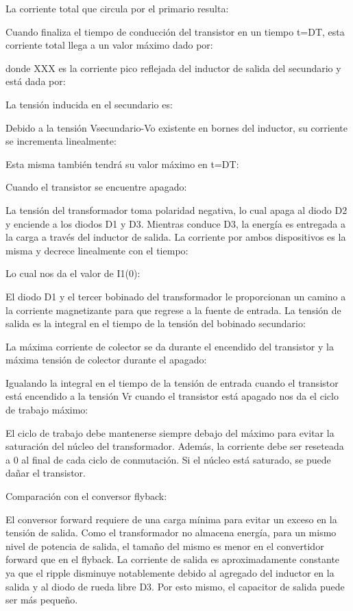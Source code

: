La corriente total que circula por el primario resulta:

Cuando finaliza el tiempo de conducción del transistor en un tiempo t=DT, esta corriente total llega a un valor máximo dado por:

donde XXX es la corriente pico reflejada del inductor de salida del secundario y está dada por:

La tensión inducida en el secundario es:

Debido a la tensión Vsecundario-Vo existente en bornes del inductor, su corriente se incrementa linealmente:

Esta misma también tendrá su valor máximo en t=DT:


Cuando el transistor se encuentre apagado:

La tensión del transformador toma polaridad negativa, lo cual apaga al diodo D2 y enciende a los diodos D1 y D3. 
Mientras conduce D3, la energía es entregada a la carga a través del inductor de salida. 
La corriente por ambos dispositivos es la misma y decrece linealmente con el tiempo:

Lo cual nos da el valor de I1(0):


El diodo D1 y el tercer bobinado del transformador le proporcionan un camino 
a la corriente magnetizante para que regrese a la fuente de entrada. 
La tensión de salida es la integral en el tiempo de la tensión del bobinado secundario:

La máxima corriente de colector se da durante el encendido del transistor y la máxima tensión de colector durante el apagado:


Igualando la integral en el tiempo de la tensión de entrada cuando el transistor está encendido a la tensión Vr cuando el transistor está apagado nos da el ciclo de trabajo máximo:


El ciclo de trabajo debe mantenerse siempre debajo del máximo para evitar la saturación del núcleo del transformador. 
Además, la corriente debe ser reseteada a 0 al final de cada ciclo de conmutación. 
Si el núcleo está saturado, se puede dañar el transistor. 

Comparación con el conversor flyback:

El conversor forward requiere de una carga mínima para evitar un exceso en la tensión de salida. 
Como el transformador no almacena energía, para un mismo nivel de potencia de salida, 
el tamaño del mismo es menor en el convertidor forward que en el flyback. 
La corriente de salida es aproximadamente constante ya que el ripple disminuye notablemente 
debido al agregado del inductor en la salida y al diodo de rueda libre D3.
Por esto mismo, el capacitor de salida puede ser más pequeño. 


